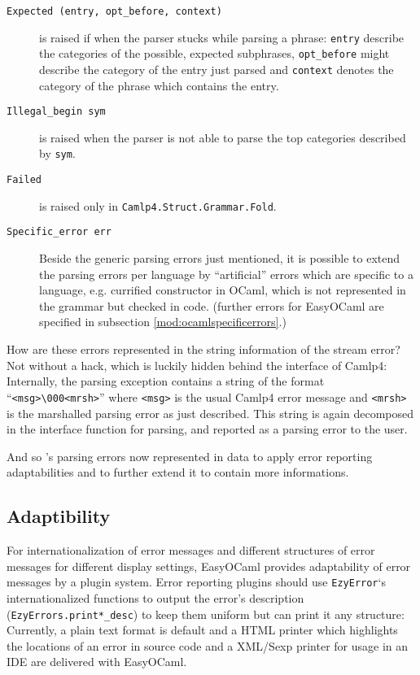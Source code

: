 \begin{description}
    \item[\texttt{Expected~(entry,~opt\_before,~context)}] is raised 
        if when the parser stucks while parsing a phrase: \texttt{entry} 
        describe the categories of the possible, expected subphrases, 
        \texttt{opt\_before} might describe the category of the entry 
        just parsed and \texttt{context} denotes the category of the 
        phrase which contains the entry.
    \item[\texttt{Illegal\_begin~sym}] is raised when the parser is 
        not able to parse the top categories described by \texttt{sym}.
    \item[\texttt{Failed}] is raised only in 
        \texttt{Camlp4.Struct.Grammar.Fold}.
    \item[\texttt{Specific\_error~err}] Beside the generic parsing 
        errors just mentioned, it is possible to extend the parsing 
        errors per language by ``artificial'' errors which are specific 
        to a language, e.g. currified constructor in OCaml, which is not
        represented in the grammar but checked in code.  (further errors for
        EasyOCaml are specified in subsection \ref{mod:ocamlspecificerrors}.)
\end{description}

How are these errors represented in the string information of the stream error?
Not without a hack, which is luckily hidden behind the interface of Camlp4:
Internally, the parsing exception contains a string of the format
``\texttt{<msg>\textbackslash 000<mrsh>}'' where \texttt{<msg>} is
the usual Camlp4 error message and \texttt{<mrsh>} is the marshalled parsing
error as just described.
This string is again decomposed in the interface function for
parsing, and reported as
a parsing error to the user.

And so \camlpf's parsing errors now represented in data to apply error
reporting adaptabilities and to further extend it to contain more informations.


\subsection{Adaptibility}
\label{hd003002}
For internationalization of error messages and different structures of error
messages for different display settings, EasyOCaml provides adaptability of
error messages by a plugin system.  Error reporting plugins should use
\texttt{EzyError}`s internationalized functions to output the error's
description (\texttt{EzyErrors.print*\_desc}) to keep them uniform but can
print it any structure:  Currently, a plain text format is default and a HTML
printer which highlights the locations of an error in source code and a
XML/Sexp printer for usage in an IDE are delivered with EasyOCaml.

